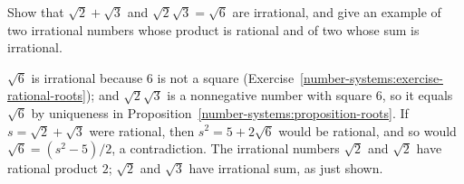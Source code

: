 \begin{exercise}\label{number-systems:exercise-irrational-sums}
Show that $\sqrt 2 + \sqrt 3$ and $\sqrt 2\sqrt 3 = \sqrt 6$ are irrational, and give an example of two irrational numbers whose product is rational and of two whose sum is irrational.
\end{exercise}

\begin{solution}
$\sqrt 6$ is irrational because $6$ is not a square (Exercise~\ref{number-systems:exercise-rational-roots}); and $\sqrt 2\sqrt 3$ is a nonnegative number with square $6$, so it equals $\sqrt 6$ by uniqueness in
Proposition~\ref{number-systems:proposition-roots}. If $s = \sqrt 2 + \sqrt 3$ were rational, then $s^2 = 5 + 2\sqrt 6$ would be rational, and so would $\sqrt 6 = (s^2 - 5)/2$, a contradiction. The irrational
numbers $\sqrt 2$ and $\sqrt 2$ have rational product $2$; $\sqrt 2$ and $\sqrt 3$ have irrational sum, as just shown.
\end{solution}
